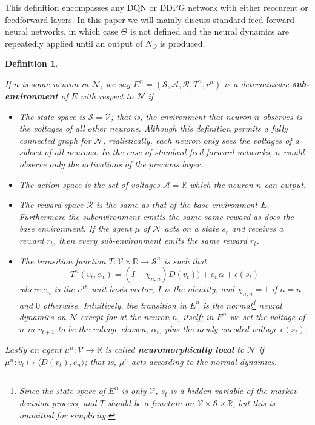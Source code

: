 \documentclass{article} %
\newtheorem{definition}[theorem]{Definition}
\numberwithin{equation}{subsection}
\numberwithin{theorem}{subsection}
\def\reals{{\mathbb R}}
\theoremstyle{named}
\def\scriptv{{\mathcal V}}
\def\scripta{{\mathcal A}}
\def\scriptr{{\mathcal R}}
\def\scriptn{{\mathcal N}}
\def\scripts{{\mathcal S}}
\begin{document}
This definition encompasses any DQN or DDPG network with either reccurent or feedforward layers. In this paper we will mainly discuss standard feed forward neural networks, in which case $\Theta$ is not defined and the neural dynamics are repeatedly applied until an output of $N_O$ is produced.


\begin{definition}\label{def:subenv}

 If $n$ is some neuron in $\scriptn$, we say $E^n = (\scripts, \scripta, \scriptr, T^n, r^n)$ is a deterministic \textbf{sub-environment} of $E$ with respect to $\scriptn$ if

\begin{itemize}
  \item The state space is $\scripts = \scriptv$;  that is, the environment that neuron $n$ observes is the voltages of all other neurons. Although this definition permits a fully connected graph for $\scriptn$, realistically, each neuron only sees the voltages of a subset of all neurons. In the case of standard feed forward networks, $n$ would observe only the activations of the previous layer.

  \item The action space is the set of voltages $\scripta = \reals$ which the neuron $n$ can output.
  \item The reward space $\scriptr$ is the same as that of the base environment $E$. Furthermore the subenvironment emitts the same same reward as does the base environment. If the agent $\mu$ of $\scriptn$ acts on a state $s_t$ and receives a reward $r_t$, then every sub-environment emits the same reward $r_t$. 
  \item The transition function $T : \scriptv \times \mathbb{R}  \to \scripts ^n$ is such that 
  \begin{equation}
    T^n(v_t, \alpha_t) = (I - \chi_{n,n}) D(v_t)) + e_n \alpha + \epsilon(s_t)
  \end{equation}
  where $e_n$ is the $n^{th}$ unit basis vector, $I$ is the identity, and $\chi_{n,n} =1$ if $n = n$ and $0$ otherwise. Intuitively, the transition in $E^n$ is the normal\footnote{Since the state space of $E^n$ is only
  $\scriptv$, $s_t$ is a hidden variable of the markov decision process, and $T$ should be a function on $\scriptv \times \scripts \times \mathbb{R}$, but this is ommitted for simplicity.} neural dynamics on $\scriptn$ except for at the neuron $n$, itself; in $E^n$ we set the voltage of $n$ in $v_{t+1}$ to be the voltage chosen, $\alpha_t$, plus the newly encoded voltage $\epsilon(s_t)$.
\end{itemize}
 Lastly an agent  $\mu^n: \scriptv \to \mathbb{R}$  is called \textbf{neuromorphically local} to $\scriptn$ if $\mu^n: v_t \mapsto \langle D(v_t), e_n \rangle$; that is, $\mu^n$ acts according to the normal dynamics.

\end{definition}
\end{document}

